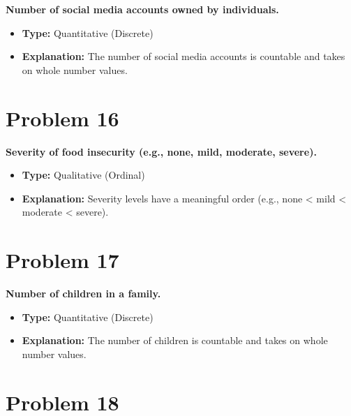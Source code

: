\documentclass[
  letterpaper,
  DIV=11,
  numbers=noendperiod]{scrreprt}
\begin{document}

\textbf{Number of social media accounts owned by individuals.}

\begin{itemize}
\item
  \textbf{Type:} Quantitative (Discrete)
\item
  \textbf{Explanation:} The number of social media accounts is countable
  and takes on whole number values.
\end{itemize}

\section*{Problem 16}\label{problem-16-2}


\textbf{Severity of food insecurity (e.g., none, mild, moderate,
severe).}

\begin{itemize}
\item
  \textbf{Type:} Qualitative (Ordinal)
\item
  \textbf{Explanation:} Severity levels have a meaningful order (e.g.,
  none \textless{} mild \textless{} moderate \textless{} severe).
\end{itemize}

\section*{Problem 17}\label{problem-17-2}


\textbf{Number of children in a family.}

\begin{itemize}
\item
  \textbf{Type:} Quantitative (Discrete)
\item
  \textbf{Explanation:} The number of children is countable and takes on
  whole number values.
\end{itemize}

\section*{Problem 18}\label{problem-18-1}

\end{document}
